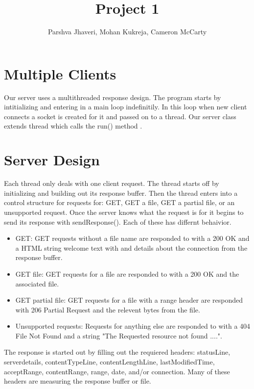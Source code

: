 \documentclass[11pt, letterpaper]{report}
\title{Project 1}
\author{Parshva Jhaveri, Mohan Kukreja, Cameron McCarty}
\begin{document}
\maketitle

\section{Multiple Clients}
Our server uses a multithreaded response design. The program starts by intitializing and entering in a main loop indefinitily. In this loop when new client connects a socket is created for it and passed on to a thread. Our server class extends thread which calls the run() method . \\

\section{Server Design}
Each thread only deals with one client request. The thread starts off by initializing and building out its response buffer. Then the thread enters into a control structure for requests for: GET, GET a file, GET a partial file, or an unsupported request. Once the server knows what the request is for it begins to send its response with sendResponse(). Each of these has differnt behaivior.

\begin{itemize}
    \item GET: GET requests without a file name are responded to with a 200 OK and a HTML string welcome text with and details about the connection from the response buffer.
    \item GET file: GET requests for a file are responded to with a 200 OK and the associated file.
    \item GET partial file: GET requests for a file with a range header are responded with 206 Partial Request and the relevent bytes from the file.
    \item Unsupported requests: Requests for anything else are responded to with a 404 File Not Found and a string "The Requested resource not found ....".
\end{itemize}

The response is started out by filling out the requiered headers: statusLine, serverdetails, contentTypeLine, contentLengthLine, lastModifiedTime, acceptRange, contentRange, range, date, and/or connection. Many of these headers are measuring the response buffer or file. \\
\end{document}
